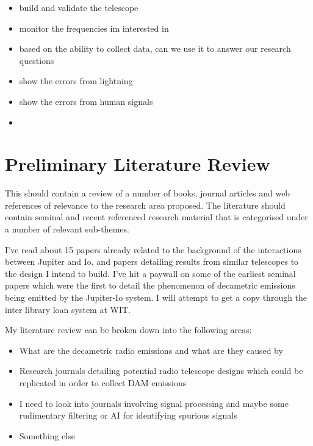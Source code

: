 \documentclass[runningheads,a4paper]{llncs}
\begin{document}
\begin{itemize}
  \item build and validate the telescope
  \item monitor the frequencies im interested in
  \item based on the ability to collect data, can we use it to answer our research questions
  \item show the errors from lightning
  \item show the errors from human signals
  \item 
\end{itemize}

%
%
\newpage
\section*{Preliminary Literature Review}
This should contain a review of a number of books, journal articles and web references of relevance to the research area proposed. The literature should contain seminal and recent referenced research material that is categorised under a number of relevant sub-themes.


I've read about 15 papers already related to the background of the interactions between Jupiter and Io, and papers detailing results from similar telescopes to the design I intend to build. I've hit a paywall on some of the earliest seminal papers which were the first to detail the phenomenon of decametric emissions being emitted by the Jupiter-Io system. I will attempt to get a copy through the inter library loan system at WIT.


My literature review can be broken down into the following areas:

\begin{itemize}
  \item What are the decametric radio emissions and what are they caused by
  \item Research journals detailing potential radio telescope designs which could be replicated in order to collect DAM emissions
  \item I need to look into journals involving signal processing and maybe some rudimentary filtering or AI for identifying spurious signals
  \item Something else
  
\end{itemize}
%
%
\newpage
\end{document}
